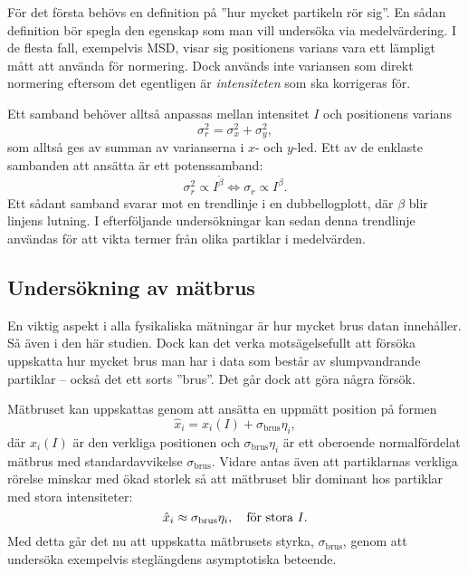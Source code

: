 För det första behövs en definition på ''hur mycket partikeln rör sig''. En sådan definition bör spegla den egenskap som man vill undersöka via medelvärdering. I de flesta fall, exempelvis MSD, visar sig positionens varians vara ett lämpligt mått att använda för normering. Dock används inte variansen som direkt normering eftersom det egentligen är \emph{intensiteten} som ska korrigeras för.

Ett samband behöver alltså anpassas mellan intensitet $I$ och positionens varians
\begin{equation}
\sigma_r^2=\sigma_x^2+\sigma_y^2,
\end{equation}
som alltså ges av summan av varianserna i $x$- och $y$-led.
Ett av de enklaste sambanden att ansätta är ett potenssamband:
\begin{equation}
\sigma_r^2 \propto I^{\tilde\beta} 
\Longleftrightarrow 
\sigma_r \propto I^\beta.
\end{equation}
Ett sådant samband svarar mot en trendlinje i en dubbellogplott, där $\beta$ blir linjens lutning. I efterföljande undersökningar kan sedan denna trendlinje användas för att vikta termer från olika partiklar i medelvärden. %

\subsection{Undersökning av mätbrus}
En viktig aspekt i alla fysikaliska mätningar är hur mycket brus datan innehåller. Så även i den här studien. Dock kan det verka motsägelsefullt att försöka uppskatta hur mycket brus man har i data som består av slumpvandrande partiklar -- också det ett sorts ''brus''. Det går dock att göra några försök. 

Mätbruset kan uppskattas genom att ansätta en uppmätt position på formen
\begin{equation}
\hat{x}_i = x_i(I) + \sigma_\text{brus}\eta_i,
\end{equation}
där $x_i(I)$ är den verkliga positionen och $\sigma_\text{brus}\eta_i$ är ett oberoende normalfördelat mätbrus med standardavvikelse $\sigma_\text{brus}$. Vidare antas även att partiklarnas verkliga rörelse minskar med ökad storlek så att mätbruset blir dominant hos partiklar med stora intensiteter:
\begin{equation}\label{eq:approx_noise}
\hat{x}_i \approx \sigma_\text{brus}\eta_i \qcomma \text{för stora } I.
\end{equation}
Med detta går det nu att uppskatta mätbrusets styrka, $\sigma_\text{brus}$, genom att undersöka exempelvis steglängdens asymptotiska beteende. 

